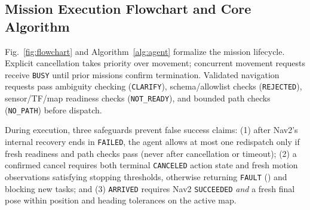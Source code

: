 \documentclass[conference,a4paper]{IEEEtran}
\begin{document}
\subsection{Mission Execution Flowchart and Core Algorithm}

Fig.~\ref{fig:flowchart} and Algorithm~\ref{alg:agent} formalize the mission lifecycle. Explicit cancellation takes priority over movement; concurrent movement requests receive \texttt{BUSY} until prior missions confirm termination. Validated navigation requests pass ambiguity checking (\texttt{CLARIFY}), schema/allowlist checks (\texttt{REJECTED}), sensor/TF/map readiness checks (\texttt{NOT\_READY}), and bounded path checks (\texttt{NO\_PATH}) before dispatch.

During execution, three safeguards prevent false success claims: (1) after Nav2's internal recovery ends in \texttt{FAILED}, the agent allows at most one redispatch only if fresh readiness and path checks pass (never after cancellation or timeout); (2) a confirmed cancel requires both terminal \texttt{CANCELED} action state and fresh motion observations satisfying stopping thresholds, otherwise returning \texttt{FAULT} () and blocking new tasks; and (3) \texttt{ARRIVED} requires Nav2 \texttt{SUCCEEDED} \emph{and} a fresh final pose within position and heading tolerances on the active map.
\end{document}
